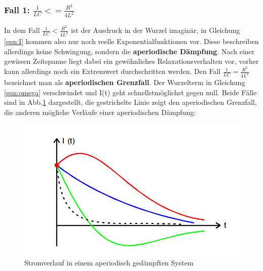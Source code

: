 \subsubsection{Fall 1: $\frac{1}{LC} <= \frac{R^2}{4L^2}$}

In dem Fall $\frac{1}{LC}<\frac{R^2}{4L^2}$ ist der Ausdruck in der
Wurzel imaginär, in Gleichung
\ref{eqn:I} kommen also nur noch reelle Exponentialfunktionen vor. Diese
beschreiben allerdings keine Schwingung, sondern die
\textbf{aperiodische Dämpfung}. Nach einer gewissen Zeitspanne liegt dabei ein
gewöhnliches Relaxationsverhalten vor, vorher kann allerdings noch ein Extremwert
durchschritten werden.
Den Fall $\frac{1}{LC}=\frac{R^2}{4L^2}$ bezeichnet man als
\textbf{aperiodischen Grenzfall}. Der Wurzelterm in Gleichung \ref{eqn:omega}
verschwindet und I(t) geht schnellstmöglichst gegen null.
Beide Fälle sind in Abb.\ref{fig:aper} dargestellt, die gestrichelte Linie zeigt
den aperiodischen Grenzfall, die anderen mögliche Verläufe einer aperiodischen
Dämpfung:
\begin{figure}
  \centering
  \includegraphics{aperiode.png}
  \caption{Stromverlauf in einem aperiodisch gedämpften System}
  \label{fig:aper}
\end{figure}

